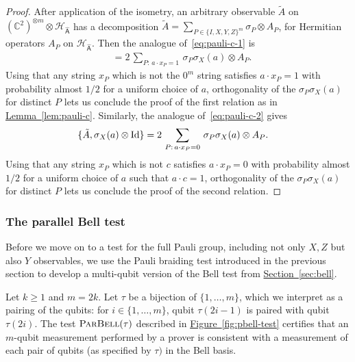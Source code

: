\documentclass[11pt]{article}
\numberwithin{equation}{section}
\theoremstyle{definition}
\theoremstyle{plain}
\newcommand{\C}{\mathbb C}
\newcommand{\expref}[2]{\hyperref[#2]{#1~\ref{#2}}}
\newcommand{\Id}{\ensuremath{\mathop{\rm Id}\nolimits}}
\newcommand{\reg}[1]{{\textsf{#1}}}
\newcommand{\mH}{\mathcal{H}}
\newcommand{\pbellt}{\textsc{ParBell}}
\begin{document}
\begin{proof}
After application of the isometry, an arbitrary observable $\tilde{A}$ on  $(\C^2)^{\otimes m} \otimes \mH_{\hat{\reg{A}}}$ has a decomposition $\tilde{A} = \sum_{P\in\{I,X,Y,Z\}^m} \sigma_P \otimes A_P$, for Hermitian operators $A_P$ on $\mH_{\hat{\reg{A}}}$. 
 Then the analogue of~\eqref{eq:pauli-c-1} is
\begin{align*}
[\tilde{A},\sigma_X(a)\otimes \Id] &= 2 \,\sum_{P:\,a\cdot x_P=1} \,\sigma_P\sigma_X(a) \otimes A_P.
\end{align*} 
Using that any string $x_P$ which is not the $0^m$ string satisfies $a\cdot x_P = 1$ with probability almost $1/2$ for a uniform choice of $a$, orthogonality of the $\sigma_P\sigma_X(a) $ for distinct $P$ lets us conclude the proof of the first relation as in \expref{Lemma}{lem:pauli-c}. Similarly, the analogue of~\eqref{eq:pauli-c-2} gives
\begin{align*}
\{\tilde{A},\sigma_X(a)\otimes \Id\} &= 2 \,\sum_{P:\,a\cdot x_P=0} \,\sigma_P\sigma_X(a) \otimes A_P.
\end{align*} 
Using that any string $x_P$ which is not $c$ satisfies $a\cdot x_P = 0$ with probability almost $1/2$ for a uniform choice of $a$ such that $a\cdot c=1$, orthogonality of the $\sigma_P\sigma_X(a) $ for distinct $P$ lets us conclude the proof of the second relation.
\end{proof}


\subsubsection{The parallel Bell test}
\label{sec:perm}


Before we move on to a test for the full Pauli group, including not only $X,Z$ but also $Y$ observables, we use the Pauli braiding test introduced in the previous section to develop a multi-qubit version of the Bell test from \expref{Section}{sec:bell}.

Let $k\geq 1$ and $m=2k$. Let $\tau$ be a bijection of $\{1,\ldots,m\}$, which we interpret as a pairing of the qubits: for $i\in\{1,\ldots,m\}$, qubit $\tau(2i-1)$ is paired with qubit $\tau(2i)$. 
The test $\pbellt(\tau)$ described in \expref{Figure}{fig:pbell-test} certifies that an $m$-qubit measurement performed by a prover is consistent with a measurement of each pair of qubits (as specified by $\tau)$ in the Bell basis. 
\end{document}
